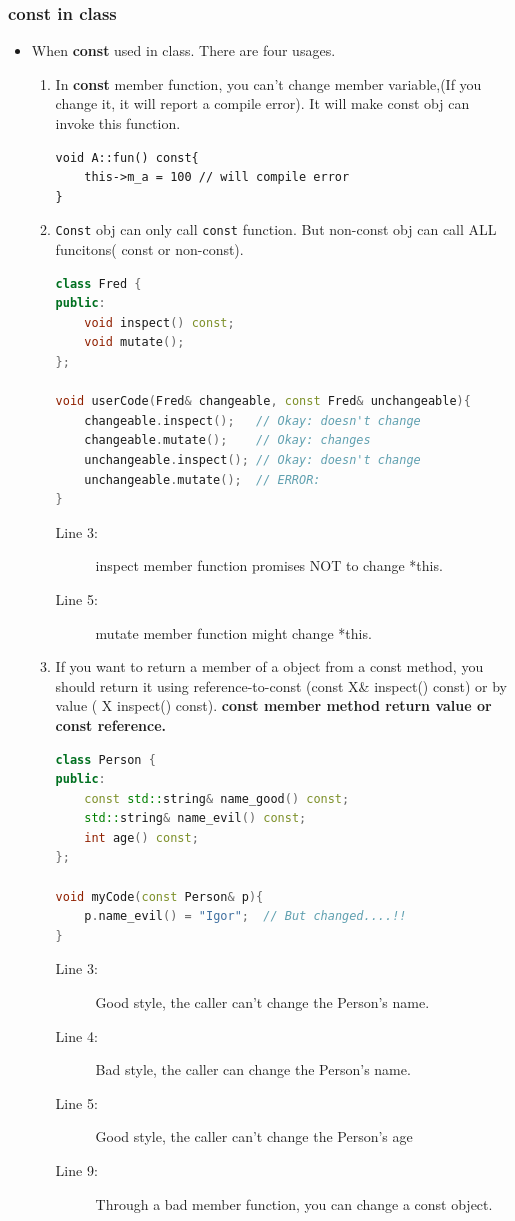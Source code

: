 \documentclass[a4paper,11pt,twoside]{book}
\begin{document}
\subsubsection{const in class}
\begin{itemize}
	
	\item When \textbf{const} used in class. There are four usages.
	\begin{enumerate}
		\item In \textbf{const} member function, you can't change member variable,(If you change it, it will report a compile error). It will make const obj can invoke this function.
\begin{lstlisting}[numbers=none]
void A::fun() const{
	this->m_a = 100 // will compile error
}
\end{lstlisting}
		
		\item \texttt{Const} obj can only call \texttt{const} function. But non-const obj can call ALL funcitons( const or non-const).
\begin{lstlisting}[frame=single, language=c++, mathescape=true]
class Fred {
public:
	void inspect() const;
	void mutate();
};
		
void userCode(Fred& changeable, const Fred& unchangeable){
	changeable.inspect();   // Okay: doesn't change
	changeable.mutate();    // Okay: changes
	unchangeable.inspect(); // Okay: doesn't change
	unchangeable.mutate();  // ERROR:
}
\end{lstlisting}
\begin{description}
	\item[Line 3:] inspect member function promises NOT to change *this.
	\item[Line 5:] mutate member function might change *this.
\end{description}
		
		\item If you want to return a member of a object from a const method, you should return it using reference-to-const (const X\& inspect() const) or by value ( X inspect() const). \textbf{const member method return value or const reference.}
\begin{lstlisting}[frame=single, language=c++]
class Person {
public:
	const std::string& name_good() const;
	std::string& name_evil() const;
	int age() const;
};
		
void myCode(const Person& p){
	p.name_evil() = "Igor";  // But changed....!!
}
\end{lstlisting}
\begin{description}
	\item[Line 3:]  Good style, the caller can't change the Person's name.
	\item[Line 4:]  Bad style, the caller can change the Person's name.
	\item[Line 5:]  Good style, the caller can't change the Person's age
	\item[Line 9:]  Through a bad member function, you can change a const object. 
\end{description}


\end{enumerate}
\end{itemize}
\end{document}
